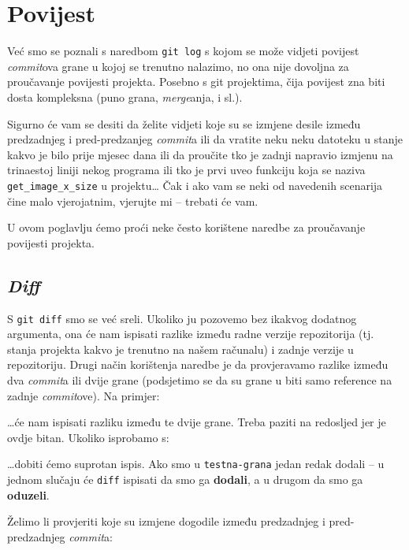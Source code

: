 \chapter*{Povijest}

Već smo se poznali s naredbom \verb+git log+ s kojom se može vidjeti povijest \emph{commit}ova grane u kojoj se trenutno nalazimo, no ona nije dovoljna za proučavanje povijesti projekta.
Posebno s git projektima, čija povijest zna biti dosta kompleksna (puno grana, \emph{merge}anja, i sl.).

Sigurno će vam se desiti da želite vidjeti koje su se izmjene desile između predzadnjeg i pred-predzanjeg \emph{commit}a ili da vratite neku neku datoteku u stanje kakvo je bilo prije mjesec dana ili da proučite tko je zadnji napravio izmjenu na trinaestoj liniji nekog programa ili tko je prvi uveo funkciju koja se naziva \verb+get_image_x_size+ u projektu\dots 
Čak i ako vam se neki od navedenih scenarija čine malo vjerojatnim, vjerujte mi -- trebati će vam.

U ovom poglavlju ćemo proći neke često korištene naredbe za proučavanje povijesti projekta.

\section*{\emph{Diff}}

S \verb+git diff+ smo se već sreli. 
Ukoliko ju pozovemo bez ikakvog dodatnog argumenta, ona će nam ispisati razlike između radne verzije repozitorija (tj. stanja projekta kakvo je trenutno na našem računalu) i zadnje verzije u repozitoriju.
Drugi način korištenja naredbe je da provjeravamo razlike između dva \emph{commit}a ili dvije grane (podsjetimo se da su grane u biti samo reference na zadnje \emph{commit}ove).
Na primjer:


\dots{}će nam ispisati razliku između te dvije grane. 
Treba paziti na redosljed jer je ovdje bitan.
Ukoliko isprobamo s:


\dots{}dobiti ćemo suprotan ispis. 
Ako smo u \verb+testna-grana+ jedan redak dodali -- u jednom slučaju će \verb+diff+ ispisati da smo ga \textbf{dodali}, a u drugom da smo ga \textbf{oduzeli}.

Želimo li provjeriti koje su izmjene dogodile između predzadnjeg i pred-predzadnjeg \emph{commit}a:

